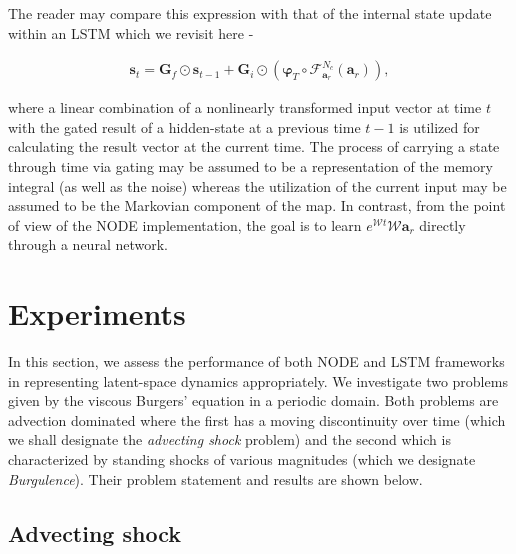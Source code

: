 \documentclass[preprint,12pt]{elsarticle}
\begin{document}
The reader may compare this expression with that of the internal state update within an LSTM which we revisit here -
\begin{linenomath*}
\begin{align}
\boldsymbol{s}_{t}=\boldsymbol{G}_{f} \odot \boldsymbol{s}_{t-1}+\boldsymbol{G}_{i} \odot\left(\boldsymbol{\varphi}_{T} \circ \mathcal{F}_{\mathbf{a}_r}^{N_{c}}(\mathbf{a}_r)\right),
\end{align}
\end{linenomath*}
where a linear combination of a nonlinearly transformed input vector at time $t$ with the gated result of a hidden-state at a previous time $t-1$ is utilized for calculating the result vector at the current time. The process of carrying a state through time via gating may be assumed to be a representation of the memory integral (as well as the noise) whereas the utilization of the current input may be assumed to be the Markovian component of the map. In contrast, from the point of view of the NODE implementation, the goal is to learn $e^{\mathcal{W} t} \mathcal{W} \mathbf{a}_{r}$ directly through a neural network. 

\section{Experiments}

In this section, we assess the performance of both NODE and LSTM frameworks in representing latent-space dynamics appropriately. We investigate two problems given by the viscous Burgers' equation in a periodic domain. Both problems are advection dominated where the first has a moving discontinuity over time (which we shall designate the \emph{advecting shock} problem) and the second which is characterized by standing shocks of various magnitudes (which we designate \emph{Burgulence}). Their problem statement and results are shown below.

\subsection{Advecting shock}
\end{document}

